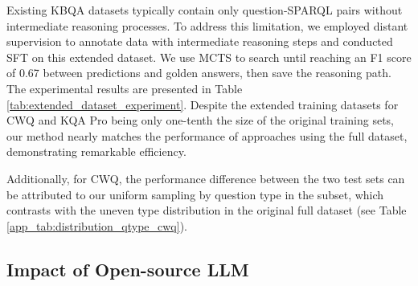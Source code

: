 \begin{table*}
\centering
{}
\caption{Experiment on extended (Ext.) dataset.}
\label{tab:extended_dataset_experiment}
\end{table*}

Existing KBQA datasets typically contain only question-SPARQL pairs without intermediate reasoning processes. 
To address this limitation, we employed distant supervision to annotate data with intermediate reasoning steps and conducted SFT on this extended dataset.
We use MCTS to search until reaching an F1 score of 0.67 between predictions and golden answers, then save the reasoning path.
The experimental results are presented in Table \ref{tab:extended_dataset_experiment}.
Despite the extended training datasets for CWQ and KQA Pro being only one-tenth the size of the original training sets, our method nearly matches the performance of approaches using the full dataset, demonstrating remarkable efficiency.

Additionally, for CWQ, the performance difference between the two test sets can be attributed to our uniform sampling by question type in the subset, which contrasts with the uneven type distribution in the original full dataset (see Table \ref{app_tab:distribution_qtype_cwq}).


\subsection{Impact of Open-source LLM}

